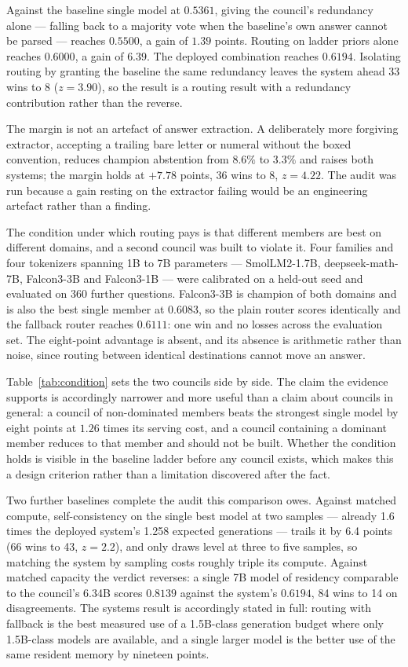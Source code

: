 Against the baseline single model at $0.5361$, giving the council's redundancy
alone --- falling back to a majority vote when the baseline's own answer cannot
be parsed --- reaches $0.5500$, a gain of $1.39$ points. Routing on ladder priors
alone reaches $0.6000$, a gain of $6.39$. The deployed combination reaches
$0.6194$. Isolating routing by granting the baseline the same redundancy leaves
the system ahead 33 wins to 8 ($z = 3.90$), so the result is a routing result
with a redundancy contribution rather than the reverse.

The margin is not an artefact of answer extraction. A deliberately more
forgiving extractor, accepting a trailing bare letter or numeral without the
boxed convention, reduces champion abstention from $8.6\%$ to $3.3\%$ and raises
both systems; the margin holds at $+7.78$ points, 36 wins to 8, $z = 4.22$. The
audit was run because a gain resting on the extractor failing would be an
engineering artefact rather than a finding.

The condition under which routing pays is that different members are best on
different domains, and a second council was built to violate it. Four families
and four tokenizers spanning 1B to 7B parameters --- SmolLM2-1.7B,
deepseek-math-7B, Falcon3-3B and Falcon3-1B --- were calibrated on a held-out
seed and evaluated on 360 further questions. Falcon3-3B is champion of both
domains and is also the best single member at $0.6083$, so the plain router
scores identically and the fallback router reaches $0.6111$: one win and no
losses across the evaluation set. The eight-point advantage is absent, and its
absence is arithmetic rather than noise, since routing between identical
destinations cannot move an answer.

Table~\ref{tab:condition} sets the two councils side by side. The claim the
evidence supports is accordingly narrower and more useful than a claim about
councils in general: a council of non-dominated members beats the strongest
single model by eight points at $1.26$ times its serving cost, and a council
containing a dominant member reduces to that member and should not be built.
Whether the condition holds is visible in the baseline ladder before any council
exists, which makes this a design criterion rather than a limitation discovered
after the fact.

Two further baselines complete the audit this comparison owes. Against matched
compute, self-consistency on the single best model at two samples --- already
1.6 times the deployed system's 1.258 expected generations --- trails it by 6.4
points (66 wins to 43, $z = 2.2$), and only draws level at three to five samples,
so matching the system by sampling costs roughly triple its compute. Against
matched capacity the verdict reverses: a single 7B model of residency comparable
to the council's 6.34B scores $0.8139$ against the system's $0.6194$, 84 wins to
14 on disagreements. The systems result is accordingly stated in full: routing
with fallback is the best measured use of a 1.5B-class generation budget where
only 1.5B-class models are available, and a single larger model is the better
use of the same resident memory by nineteen points.

